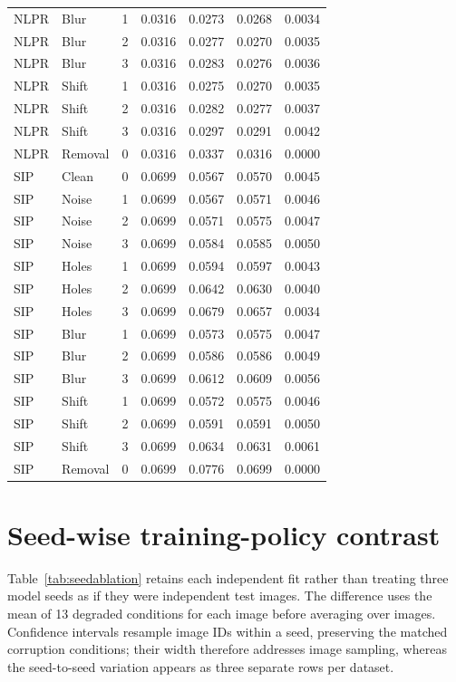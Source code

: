\documentclass[11pt]{article}
\begin{document}
\begin{longtable}{llrrrrr}
NLPR & Blur & 1 & 0.0316 & 0.0273 & 0.0268 & 0.0034\\
NLPR & Blur & 2 & 0.0316 & 0.0277 & 0.0270 & 0.0035\\
NLPR & Blur & 3 & 0.0316 & 0.0283 & 0.0276 & 0.0036\\
NLPR & Shift & 1 & 0.0316 & 0.0275 & 0.0270 & 0.0035\\
NLPR & Shift & 2 & 0.0316 & 0.0282 & 0.0277 & 0.0037\\
NLPR & Shift & 3 & 0.0316 & 0.0297 & 0.0291 & 0.0042\\
NLPR & Removal & 0 & 0.0316 & 0.0337 & 0.0316 & 0.0000\\
SIP & Clean & 0 & 0.0699 & 0.0567 & 0.0570 & 0.0045\\
SIP & Noise & 1 & 0.0699 & 0.0567 & 0.0571 & 0.0046\\
SIP & Noise & 2 & 0.0699 & 0.0571 & 0.0575 & 0.0047\\
SIP & Noise & 3 & 0.0699 & 0.0584 & 0.0585 & 0.0050\\
SIP & Holes & 1 & 0.0699 & 0.0594 & 0.0597 & 0.0043\\
SIP & Holes & 2 & 0.0699 & 0.0642 & 0.0630 & 0.0040\\
SIP & Holes & 3 & 0.0699 & 0.0679 & 0.0657 & 0.0034\\
SIP & Blur & 1 & 0.0699 & 0.0573 & 0.0575 & 0.0047\\
SIP & Blur & 2 & 0.0699 & 0.0586 & 0.0586 & 0.0049\\
SIP & Blur & 3 & 0.0699 & 0.0612 & 0.0609 & 0.0056\\
SIP & Shift & 1 & 0.0699 & 0.0572 & 0.0575 & 0.0046\\
SIP & Shift & 2 & 0.0699 & 0.0591 & 0.0591 & 0.0050\\
SIP & Shift & 3 & 0.0699 & 0.0634 & 0.0631 & 0.0061\\
SIP & Removal & 0 & 0.0699 & 0.0776 & 0.0699 & 0.0000\\
\end{longtable}
\normalsize

\section{Seed-wise training-policy contrast}
Table~\ref{tab:seedablation} retains each independent fit rather than treating three model seeds as if they were independent test images. The difference uses the mean of 13 degraded conditions for each image before averaging over images. Confidence intervals resample image IDs within a seed, preserving the matched corruption conditions; their width therefore addresses image sampling, whereas the seed-to-seed variation appears as three separate rows per dataset.
\end{document}
